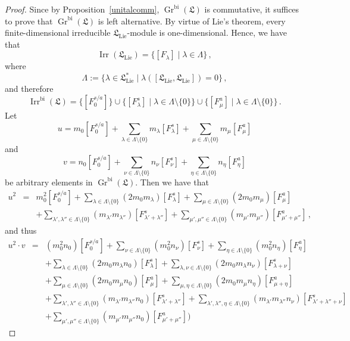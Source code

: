\documentclass{jonasart}
\DeclareMathOperator{\bi}{bi}
\DeclareMathOperator{\irr}{Irr}
\DeclareMathOperator{\K}{Gr}
\DeclareMathOperator{\lie}{Lie}
\newcommand{\lf}{\mathfrak{L}}
\begin{document}
	\begin{proof}
		Since by Proposition~\ref{unitalcomm}, $\K^{\bi}(\lf)$ is commutative, it suffices to prove that $\K^{\bi}(\lf)$ is left alternative. By virtue of Lie's theorem, every finite-dimensional irreducible $\lf_{\lie}$-module is one-dimensional. Hence, we have that
		\[
			\irr(\lf_{\lie})=\{[F_\lambda]\mid\lambda\in\Lambda\}\,,
		\]
		where
		\[
			\Lambda:=\{\lambda\in\lf_{\lie}^*\mid\lambda([\lf_{\lie},\lf_{\lie}])=0\}\,,
		\]
		and therefore
		\[
			\irr^{\bi}(\lf)=\{[F_0^{s/a}]\}\cup\{[F_\lambda^s ]\mid\lambda\in\Lambda\setminus\{0\}\}
			\cup\{[F_\mu^a ]\mid\lambda\in\Lambda\setminus\{0\}\}\,.
		\]
		Let
		\[
			u=m_0 [F_0^{s/a}]+\sum_{\lambda\in\Lambda\setminus\{0\}}m_\lambda[F_\lambda^s ]
			+\sum_{\mu\in\Lambda\setminus\{0\}}m_\mu[F_\mu^a ]
		\]
		and
		\[
			v=n_0 [F_0^{s/a}]+\sum_{\nu\in\Lambda\setminus\{0\}}n_\nu[F_\nu^s ]
			+\sum_{\eta\in\Lambda\setminus\{0\}}n_\eta[F_\eta^a ]
		\]
		be arbitrary elements in $\K^{\bi}(\lf)$. Then we have that
		\begin{eqnarray*}
			u^2 & = & m_0^2 [F_0^{s/a}]+\sum_{\lambda\in\Lambda\setminus\{0\}}(2m_0 m_\lambda)
			[F_\lambda^s ]+\sum_{\mu\in\Lambda\setminus\{0\}}(2m_0 m_\mu)[F_\mu^a ]\\
			&& +\sum_{\lambda',\lambda''\in\Lambda\setminus\{0\}}(m_{\lambda'}m_{\lambda''})
			[F_{\lambda'+\lambda''}^s ]+\sum_{\mu',\mu''\in\Lambda\setminus\{0\}}
			(m_{\mu'}m_{\mu''})[F_{\mu'+\mu''}^a ]\,,
		\end{eqnarray*}
		and thus
		\begin{eqnarray*}
			u^2\cdot v & = & (m_0^2 n_0 )[F_0^{s/a}]+\sum_{\nu\in\Lambda\setminus\{0\}}(m_0^2 n_\nu)
			[F_\nu^s ]+\sum_{\eta\in\Lambda\setminus\{0\}}(m_0^2 n_\eta)[F_\eta^a ]\\
			&& +\sum_{\lambda\in\Lambda\setminus\{0\}}(2m_0 m_\lambda n_0 )[F_\lambda^s ]
			+\sum_{\lambda,\nu\in\Lambda\setminus\{0\}}(2m_0 m_\lambda n_\nu)[F_{\lambda+\nu}^s ]\\
			&& +\sum_{\mu\in\Lambda\setminus\{0\}}(2m_0 m_\mu n_0 )[F_\mu^a ]
			+\sum_{\mu,\eta\in\Lambda\setminus\{0\}}(2m_0 m_\mu n_\eta)[F_{\mu+\eta}^a ]\\
			&& +\sum_{\lambda',\lambda''\in\Lambda\setminus\{0\}}(m_{\lambda'}m_{\lambda''}n_0 )
			[F_{\lambda'+\lambda''}^s ]+\sum_{\lambda',\lambda'',\eta\in\Lambda\setminus\{0\}}
			(m_{\lambda'}m_{\lambda''}n_\nu)[F_{\lambda'+\lambda''+\nu}^s ]\\
			&& +\sum_{\mu',\mu''\in\Lambda\setminus\{0\}}(m_{\mu'}m_{\mu''}n_0 )[F_{\mu'+\mu''}^a ])

\end{eqnarray*}
\end{proof}
\end{document}
